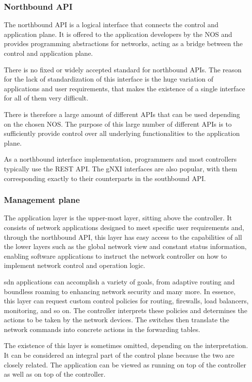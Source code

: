 \subsubsection{Northbound API} %
The northbound API is a logical interface that connects the control and application plane. It is offered to the application developers by the NOS\cite{kreutz_software-defined_2015} and provides programming abstractions for networks, acting as a bridge between the control and application plane. \cite{latif_comprehensive_2020}

There is no fixed or widely accepted standard for northbound APIs\cite{kreutz_software-defined_2015}\cite{latif_comprehensive_2020}. The reason for the lack of standardization of this interface is the huge variation of applications and user requirements, that makes the existence of a single interface for all of them very difficult.

There is therefore a large amount of different APIs that can be used depending on the chosen NOS. The purpose of this large number of different APIs is to sufficiently provide control over all underlying functionalities to the application plane\cite{peterson_software-defined_2021}.

As a northbound interface implementation, programmers and most controllers typically use the REST API\cite{latif_comprehensive_2020}. The gNXI interfaces are also popular, with them corresponding exactly to their counterparts in the southbound API. \cite{peterson_software-defined_2021}
        

\subsubsection{Management plane} %
The application layer is the upper-most layer, sitting above the controller. It consists of network applications designed to meet specific user requirements\cite{Zhang et al., 2018} and, through the northbound API, this layer has easy access to the capabilities of all the lower layers such as the global network view and constant status information, enabling software applications to instruct the network controller on how to implement network control and operation logic. \cite{xia_survey_2015} \cite{liatifis_advancing_2023}

\gls{sdn} applications can accomplish a variety of goals, from adaptive routing and boundless roaming to enhancing network security and many more\cite{xia_survey_2015}. In essence, this layer can request custom control policies for routing, firewalls, load balancers, monitoring, and so on. The controller interprets these policies and determines the actions to be taken by the network devices. The switches then translate the network commands into concrete actions in the forwarding tables. \cite{kreutz_software-defined_2015}

The existence of this layer is sometimes omitted, depending on the interpretation. It can be considered an integral part of the control plane because the two are closely related. The application can be viewed as running on top of the controller as well as on top of the controller\cite{peterson_software-defined_2021}.

